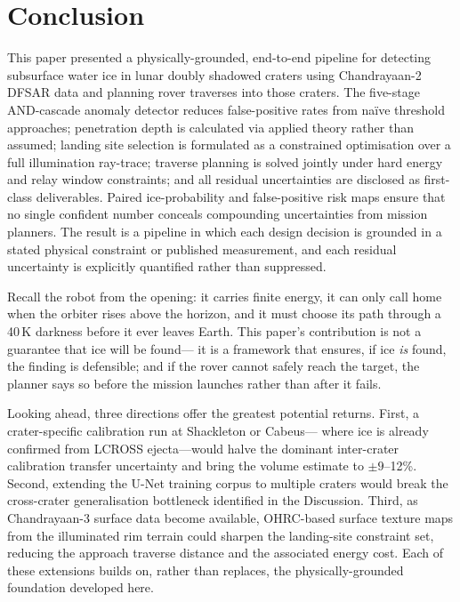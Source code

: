 \documentclass[10pt,conference]{IEEEtran}
\begin{document}
\section{Conclusion}
\label{sec:conclusion}

This paper presented a physically-grounded, end-to-end
pipeline for detecting subsurface water ice in lunar doubly shadowed
craters using Chandrayaan-2 DFSAR data and planning rover traverses
into those craters.
The five-stage AND-cascade anomaly detector reduces false-positive rates
from na{\"i}ve threshold approaches; penetration depth is calculated via applied theory rather
than assumed; landing site selection is formulated as a constrained
optimisation over a full illumination ray-trace; traverse planning is
solved jointly under hard energy and relay window constraints; and all
residual uncertainties are disclosed as first-class deliverables.
Paired ice-probability and false-positive risk maps ensure that no
single confident number conceals compounding uncertainties from mission
planners.
The result is a pipeline in which each design decision is grounded in a
stated physical constraint or published measurement, and each residual
uncertainty is explicitly quantified rather than suppressed.

Recall the robot from the opening: it carries finite energy, it can
only call home when the orbiter rises above the horizon, and it must
choose its path through a 40\,K darkness before it ever leaves Earth.
This paper's contribution is not a guarantee that ice will be found---
it is a framework that ensures, if ice \emph{is} found, the finding
is defensible; and if the rover cannot safely reach the target,
the planner says so before the mission launches rather than after
it fails.

Looking ahead, three directions offer the greatest potential returns.
First, a crater-specific calibration run at Shackleton or Cabeus---
where ice is already confirmed from LCROSS ejecta---would halve the
dominant inter-crater calibration transfer uncertainty and bring
the volume estimate to $\pm9$--12\%.
Second, extending the U-Net training corpus to multiple craters
would break the cross-crater generalisation bottleneck identified
in the Discussion.
Third, as Chandrayaan-3 surface data become available, OHRC-based
surface texture maps from the illuminated rim terrain could sharpen
the landing-site constraint set, reducing the approach traverse
distance and the associated energy cost.
Each of these extensions builds on, rather than replaces, the
physically-grounded foundation developed here.
\end{document}
